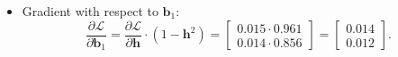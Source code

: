 \begin{notechapter}
\begin{itemize}
\[\begin{bmatrix}
          0.014 & 0 & 0 \\
          0.012 & 0 & 0
          \end{bmatrix}.
          \]
    \item Gradient with respect to \(\mathbf{b}_1\):
          \[
          \frac{\partial \mathcal{L}}{\partial \mathbf{b}_1} =
          \frac{\partial \mathcal{L}}{\partial \mathbf{h}} \cdot (1 - \mathbf{h}^2) =
          \begin{bmatrix}
          0.015 \cdot 0.961 \\
          0.014 \cdot 0.856
          \end{bmatrix} =
          \begin{bmatrix}
          0.014 \\
          0.012
          \end{bmatrix}.
          \]
\end{itemize}


\end{notechapter}
